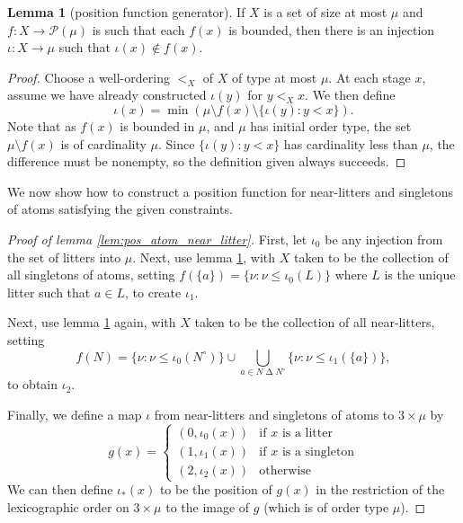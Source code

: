 \documentclass{article}
\theoremstyle{definition}
\newtheorem{lemma}[theorem]{Lemma}
\theoremstyle{remark}
\begin{document}
{\begin{lemma}[position function generator]\label{lem:position_generator}
If $X$ is a set of size at most $\mu$ and $f : X \to \mathcal P(\mu)$ is such that each $f(x)$ is bounded, then there is an injection $\iota : X \to \mu$ such that $\iota(x) \not\in f(x)$.
\end{lemma}

\begin{proof}

Choose a well-ordering $<_X$ of $X$ of type at most $\mu$.
At each stage $x$, assume we have already constructed $\iota(y)$ for $y <_X x$.
We then define
$$
\iota(x) = \min \left(\mu
\setminus f(x)
\setminus \{
\iota(y) : y < x \}\right). $$
Note that as $f(x)$ is bounded in $\mu$, and $\mu$ has initial order type, the set $\mu \setminus f(x)$ is of cardinality $\mu$.
Since $\{ \iota(y) : y < x \}$ has cardinality less than $\mu$, the difference must be nonempty, so the definition given always succeeds.
\end{proof}

We now show how to construct a position function for near-litters and singletons of atoms satisfying the given constraints.

\begin{proof}[Proof of lemma \ref{lem:pos_atom_near_litter}]

First, let $\iota_0$ be any injection from the set of litters into $\mu$.
Next, use lemma \ref{lem:position_generator}, with $X$ taken to be the collection of all singletons of atoms, setting $f(\{a\}) = \{ \nu : \nu \leq \iota_0(L) \}$ where $L$ is the unique litter such that $a \in L$, to create $\iota_1$.

Next, use lemma \ref{lem:position_generator} again, with $X$ taken to be the collection of all near-litters, setting
$$f(N) = \{ \nu : \nu \leq \iota_0(N^\circ)  \} \cup \bigcup_{a \in N \mathbin\Delta N^{\circ}}\{ \nu : \nu \leq \iota_1(\{a\})\},$$
to obtain $\iota_2$.

Finally, we define a map $\iota$ from near-litters and singletons of atoms to $3 \times \mu$ by
$$ g(x) =
\begin{cases}
  (0, \iota_0(x)) & \text{if $x$ is a litter} \\
  (1, \iota_1(x)) & \text{if $x$ is a singleton} \\
  (2, \iota_2(x)) & \text{otherwise}
\end{cases} $$
We can then define $\iota_*(x)$ to be the position of $g(x)$ in the restriction of the lexicographic order on $3 \times \mu$ to the image of $g$ (which is of order type $\mu$).


\end{proof}}
\end{document}

